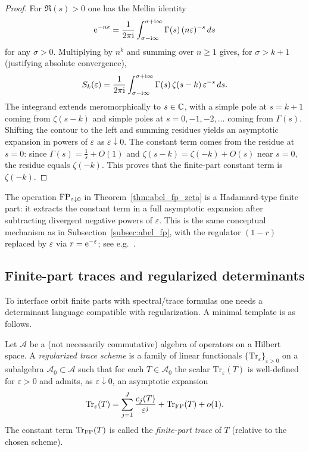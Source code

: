 \begin{proof}
For $\Re(s)>0$ one has the Mellin identity
$$
\mathrm{e}^{-n\varepsilon}=\frac{1}{2\pi\mathrm{i}}\int_{\sigma-\mathrm{i}\infty}^{\sigma+\mathrm{i}\infty}\Gamma(s)\,(n\varepsilon)^{-s}\,ds
$$
for any $\sigma>0$.
Multiplying by $n^k$ and summing over $n\ge 1$ gives, for $\sigma>k+1$ (justifying absolute convergence),
$$
S_k(\varepsilon)=\frac{1}{2\pi\mathrm{i}}\int_{\sigma-\mathrm{i}\infty}^{\sigma+\mathrm{i}\infty}\Gamma(s)\,\zeta(s-k)\,\varepsilon^{-s}\,ds.
$$
The integrand extends meromorphically to $s\in\mathbb{C}$, with a simple pole at $s=k+1$ coming from $\zeta(s-k)$ and simple poles at $s=0,-1,-2,\dots$ coming from $\Gamma(s)$.
Shifting the contour to the left and summing residues yields an asymptotic expansion in powers of $\varepsilon$ as $\varepsilon\downarrow 0$.
The constant term comes from the residue at $s=0$:
since $\Gamma(s)=\frac{1}{s}+O(1)$ and $\zeta(s-k)=\zeta(-k)+O(s)$ near $s=0$, the residue equals $\zeta(-k)$.
This proves that the finite-part constant term is $\zeta(-k)$.
\end{proof}

\begin{remark}
The operation $\mathrm{FP}_{\varepsilon\downarrow 0}$ in Theorem~\ref{thm:abel_fp_zeta} is a Hadamard-type finite part: it extracts the constant term in a full asymptotic expansion after subtracting divergent negative powers of $\varepsilon$.
This is the same conceptual mechanism as in Subsection~\ref{subsec:abel_fp}, with the regulator $(1-r)$ replaced by $\varepsilon$ via $r=\mathrm{e}^{-\varepsilon}$; see e.g.~\cite{EstradaKanwal2002}.
\end{remark}

\subsection{Finite-part traces and regularized determinants}
\label{subsec:fp_determinants}
To interface orbit finite parts with spectral/trace formulas one needs a determinant language compatible with regularization. A minimal template is as follows.

\begin{definition}
Let $\mathcal{A}$ be a (not necessarily commutative) algebra of operators on a Hilbert space. A \emph{regularized trace scheme} is a family of linear functionals $\{\mathrm{Tr}_\varepsilon\}_{\varepsilon>0}$ on a subalgebra $\mathcal{A}_0\subset\mathcal{A}$ such that for each $T\in\mathcal{A}_0$ the scalar $\mathrm{Tr}_\varepsilon(T)$ is well-defined for $\varepsilon>0$ and admits, as $\varepsilon\downarrow 0$, an asymptotic expansion
$$
\mathrm{Tr}_\varepsilon(T)=\sum_{j=1}^{J}\frac{c_j(T)}{\varepsilon^{j}}+\mathrm{Tr}_{\mathrm{FP}}(T)+o(1).
$$
The constant term $\mathrm{Tr}_{\mathrm{FP}}(T)$ is called the \emph{finite-part trace} of $T$ (relative to the chosen scheme).
\end{definition}

